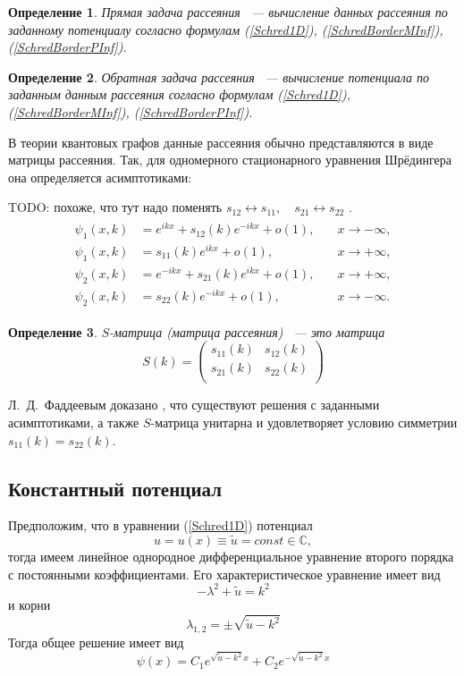 \documentclass[a4 paper, 12 pt]{extarticle}
\newtheorem{Def}{Определение}[section]
\begin{document}
   \begin{Def}
   	Прямая задача рассеяния ~--- вычисление данных рассеяния по заданному потенциалу согласно формулам (\ref{Schred1D}), (\ref{SchredBorderMInf}), (\ref{SchredBorderPInf}).
   \end{Def}

   \begin{Def}
   	Обратная задача рассеяния ~--- вычисление потенциала по заданным данным рассеяния согласно формулам (\ref{Schred1D}), (\ref{SchredBorderMInf}), (\ref{SchredBorderPInf}).
   \end{Def}

   В теории квантовых графов данные рассеяния обычно представляются в виде матрицы рассеяния. Так, для одномерного стационарного уравнения Шрёдингера она определяется асимптотиками:
   
   TODO: похоже, что тут надо поменять $s_{12} \leftrightarrow s_{11}, \quad s_{21} \leftrightarrow s_{22}$ .
   \begin{gather*}
   \begin{aligned}
   \psi_1(x,k)&=e^{ikx}+s_{12}(k)e^{-ikx}+o(1), \quad &x\rightarrow-\infty,\\
   \psi_1(x,k)&=s_{11}(k)e^{ikx}+o(1), \quad &x\rightarrow+\infty,\\
   \psi_2(x,k)&=e^{-ikx}+s_{21}(k)e^{ikx}+o(1), \quad &x\rightarrow+\infty,\\
   \psi_2(x,k)&=s_{22}(k)e^{-ikx}+o(1), \quad &x\rightarrow-\infty.
   \end{aligned}
   \end{gather*}
   

   \begin{Def}
   	$S$-матрица (матрица рассеяния) ~--- это матрица 
    \begin{equation}\label{DSM}
    S(k)=\left(%
    \begin{array}{cc}
    s_{11}(k) & s_{12}(k) \\
    s_{21}(k) & s_{22}(k) \\
    \end{array}%
    \right)
    \end{equation}
   \end{Def}

   Л.~Д.~Фаддеевым доказано \cite{SMatrix}, что существуют решения с заданными асимптотиками, а также $S$-матрица унитарна и удовлетворяет условию симметрии $s_{11}\left(k\right) = s_{22}\left(k\right)$.
   
   \subsection{Константный потенциал}
   Предположим, что в уравнении (\ref{Schred1D}) потенциал $$u = u\left(x\right) \equiv \tilde{u} = const \in \mathbb{C},$$ тогда имеем линейное однородное дифференциальное уравнение второго порядка с постоянными коэффициентами. Его характеристическое уравнение имеет вид
   \[-\lambda^2+\tilde{u} = k^2\]
   и корни
   \[\lambda_{1,2}=\pm \sqrt{\tilde{u}-k^2}\]
   Тогда общее решение имеет вид
   \[
   \psi\left(x\right)= C_1 e^{\sqrt{\tilde{u}-k^2}x} + C_2 e^{-\sqrt{\tilde{u}-k^2}x}
   \]
   
\end{document}
